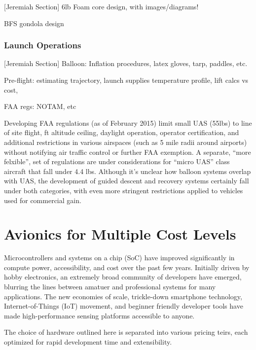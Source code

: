 \documentclass[heading.tex]{subfiles}
\begin{document}
[Jeremiah Section]
\<6lb Foam core design, with images/diagrams!

BFS gondola design

\subsubsection{Launch Operations}

[Jeremiah Section]
Balloon: Inflation procedures, latex gloves, tarp, paddles, etc.

Pre-flight: estimating trajectory, launch supplies
temperature profile, lift calcs vs cost, 

FAA regs: NOTAM, etc

Developing FAA regulations (as of February 2015) limit small UAS (\<55lbs) to
line of site flight,  ft altitude ceiling, daylight operation, operator certification,
and additional restrictions in various airspaces (such as 5 mile radii around airports)
without notifying air traffic control or further FAA exemption.
A separate, ``more felxible'', set of regulations are under considerations
for ``micro UAS'' class aircraft that fall under 4.4 lbs.
Although it's unclear how balloon systems overlap with UAS, the development
of guided descent and recovery systems certainly fall under both categories,
with even more stringent restrictions applied to vehicles used for commercial gain.
\cite{FAAuav}


\section{Avionics for Multiple Cost Levels}

Microcontrollers and systems on a chip (SoC) have improved significantly in 
compute power, accessibility, and cost over the past few years.
Initially driven by hobby electronics, an extremely broad community of developers
have emerged, blurring the lines between amatuer and professional systems for
many applications. The new economies of scale, trickle-down smartphone
technology, Internet-of-Things (IoT) movement, and beginner friendly developer
tools have made high-performance sensing platforms accessible to anyone.

The choice of hardware outlined here is separated into various pricing teirs,
each optimized for rapid development time and extensibility.
\end{document}
